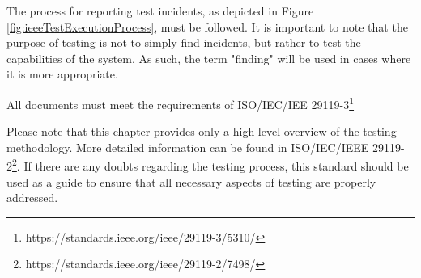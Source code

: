 The process for reporting test incidents, as depicted in Figure \ref{fig:ieeeTestExecutionProcess}, must be followed. It is important to note that the purpose of testing is not to simply find incidents, but rather to test the capabilities of the system. As such, the term "finding" will be used in cases where it is more appropriate.

All documents must meet the requirements of ISO/IEC/IEE 29119-3\footnote[4]{https://standards.ieee.org/ieee/29119-3/5310/}

Please note that this chapter provides only a high-level overview of the testing methodology. More detailed information can be found in ISO/IEC/IEEE 29119-2\footnote[5]{https://standards.ieee.org/ieee/29119-2/7498/}. If there are any doubts regarding the testing process, this standard should be used as a guide to ensure that all necessary aspects of testing are properly addressed.















